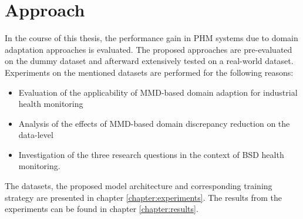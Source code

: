 \section{Approach}
In the course of this thesis, the performance gain in PHM systems due to domain adaptation approaches is evaluated. The proposed approaches are pre-evaluated on the dummy dataset and afterward extensively tested on a real-world dataset. Experiments on the mentioned datasets are performed for the following reasons:
\begin{itemize}
    \item Evaluation of the applicability of MMD-based domain adaption for industrial health monitoring
    \item Analysis of the effects of MMD-based domain discrepancy reduction on the data-level
    \item Investigation of the three research questions in the context of BSD health monitoring.
\end{itemize}

The datasets, the proposed model architecture and corresponding training strategy are presented in chapter \ref{chapter:experiments}. The results from the experiments can be found in chapter \ref{chapter:results}. 
\begin{comment}
\section{Signals used for PHM}
In the work of Pandhare et al. \cite{Pandhare2021} just vibration signals in different spatial directions are measured with sensors, installed at various locations on the BSD. Azamfar et al. \cite{AZAMFAR2020103932} additionally use sound pressure sensors to capture the acoustic level and extract torque and speed signals from the controller. In this thesis also the mechanical power, target electrical power and actual electrical power signals were extracted from the controller. Pandhare et al. and Azamfar et al. record machine data during BSD steady-state motion. In this thesis machine data is collected during different machine excitements (constant speed excitements, direction change excitements and sweep excitement) along the machine tools X-axis. These different signals were evaluated for their suitability for PHM of BSDs


Both Pandhare et al. \cite{Pandhare2021} and Azamfar et al. \cite{AZAMFAR2020103932} feed the data recorded during BSD steady-state motion as one single input to their models. During the phases of constant BSD motion, the amplitude of the signals changess. Azamfar et al. assume that the shorter sequences created by a windowing function just capture limited information about these changes and are therefore not a proper tool for PHM \cite{AZAMFAR2020103932}. In the thesis a windowing function was evaluated for the PHM of BSDs. Windowing functions make the BSD experiments less dependent from specific BSD excitements. When beeing able to check the BSD degradation with short recorded windows, one can make statements about the BSD health status with data redcorded in real time use. Extra experiments 
\end{comment}


